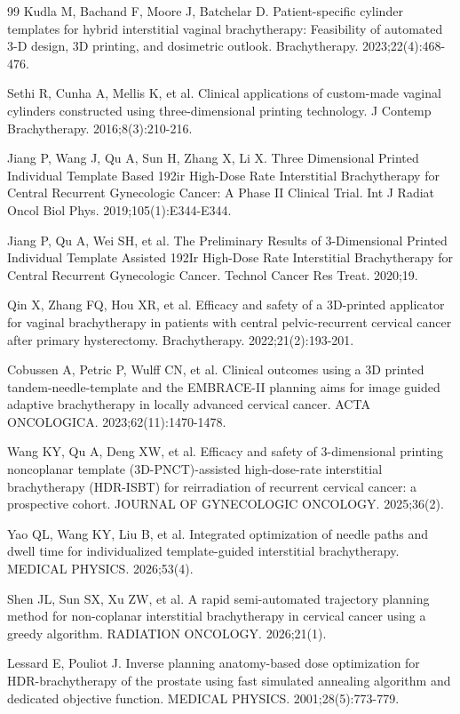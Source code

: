 \documentclass[12pt,twoside,letterpaper]{article}
\newcounter{algorithm}
\begin{document}
\begin{thebibliography}{99}
 Kudla M, Bachand F, Moore J, Batchelar D. Patient-specific cylinder templates for hybrid interstitial vaginal brachytherapy: Feasibility of automated 3-D design, 3D printing, and dosimetric outlook. Brachytherapy. 2023;22(4):468-476.

 Sethi R, Cunha A, Mellis K, et al. Clinical applications of custom-made vaginal cylinders constructed using three-dimensional printing technology. J Contemp Brachytherapy. 2016;8(3):210-216.

 Jiang P, Wang J, Qu A, Sun H, Zhang X, Li X. Three Dimensional Printed Individual Template Based 192ir High-Dose Rate Interstitial Brachytherapy for Central Recurrent Gynecologic Cancer: A Phase II Clinical Trial. Int J Radiat Oncol Biol Phys. 2019;105(1):E344-E344.

 Jiang P, Qu A, Wei SH, et al. The Preliminary Results of 3-Dimensional Printed Individual Template Assisted 192Ir High-Dose Rate Interstitial Brachytherapy for Central Recurrent Gynecologic Cancer. Technol Cancer Res Treat. 2020;19.

 Qin X, Zhang FQ, Hou XR, et al. Efficacy and safety of a 3D-printed applicator for vaginal brachytherapy in patients with central pelvic-recurrent cervical cancer after primary hysterectomy. Brachytherapy. 2022;21(2):193-201.

 Cobussen A, Petric P, Wulff CN, et al. Clinical outcomes using a 3D printed tandem-needle-template and the EMBRACE-II planning aims for image guided adaptive brachytherapy in locally advanced cervical cancer. ACTA ONCOLOGICA. 2023;62(11):1470-1478.

 Wang KY, Qu A, Deng XW, et al. Efficacy and safety of 3-dimensional printing noncoplanar template (3D-PNCT)-assisted high-dose-rate interstitial brachytherapy (HDR-ISBT) for reirradiation of recurrent cervical cancer: a prospective cohort. JOURNAL OF GYNECOLOGIC ONCOLOGY. 2025;36(2).

 Yao QL, Wang KY, Liu B, et al. Integrated optimization of needle paths and dwell time for individualized template-guided interstitial brachytherapy. MEDICAL PHYSICS. 2026;53(4).

 Shen JL, Sun SX, Xu ZW, et al. A rapid semi-automated trajectory planning method for non-coplanar interstitial brachytherapy in cervical cancer using a greedy algorithm. RADIATION ONCOLOGY. 2026;21(1).

 Lessard E, Pouliot J. Inverse planning anatomy-based dose optimization for HDR-brachytherapy of the prostate using fast simulated annealing algorithm and dedicated objective function. MEDICAL PHYSICS. 2001;28(5):773-779.


\end{thebibliography}
\end{document}
